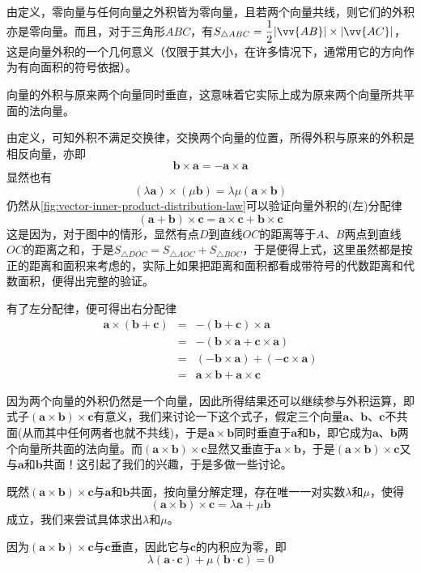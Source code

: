 由定义，零向量与任何向量之外积皆为零向量，且若两个向量共线，则它们的外积亦是零向量。而且，对于三角形$ABC$，有$S_{\triangle ABC} = \dfrac{1}{2}|\vv{AB}|\times|\vv{AC}|$，这是向量外积的一个几何意义（仅限于其大小，在许多情况下，通常用它的方向作为有向面积的符号依据）。

向量的外积与原来两个向量同时垂直，这意味着它实际上成为原来两个向量所共平面的法向量。

由定义，可知外积不满足交换律，交换两个向量的位置，所得外积与原来的外积是相反向量，亦即
\[ \bm{b} \times \bm{a} = - \bm{a} \times \bm{a} \]
显然也有
\[ (\lambda \bm{a}) \times (\mu \bm{b}) = \lambda \mu (\bm{a}\times\bm{b}) \]
仍然从\autoref{fig:vector-inner-product-distribution-law}可以验证向量外积的(左)分配律
\[ (\bm{a}+\bm{b}) \times \bm{c} = \bm{a} \times \bm{c} + \bm{b} \times \bm{c} \]
这是因为，对于图中的情形，显然有点$D$到直线$OC$的距离等于$A$、$B$两点到直线$OC$的距离之和，于是$S_{\triangle DOC} = S_{\triangle AOC} + S_{\triangle BOC}$，于是便得上式，这里虽然都是按正的距离和面积来考虑的，实际上如果把距离和面积都看成带符号的代数距离和代数面积，便得出完整的验证。

有了左分配律，便可得出右分配律
\begin{eqnarray*}
  \bm{a} \times (\bm{b} + \bm{c}) & = & - (\bm{b} + \bm{c}) \times \bm{a} \\
                                  & = & - (\bm{b} \times \bm{a} + \bm{c} \times \bm{a}) \\
                                  & = & (-\bm{b}\times\bm{a}) + (-\bm{c}\times\bm{a}) \\
  & = & \bm{a}\times\bm{b} + \bm{a}\times\bm{c}
\end{eqnarray*}

因为两个向量的外积仍然是一个向量，因此所得结果还可以继续参与外积运算，即式子$(\bm{a}\times\bm{b})\times\bm{c}$有意义，我们来讨论一下这个式子，假定三个向量$\bm{a}$、$\bm{b}$、$\bm{c}$不共面(从而其中任何两者也就不共线)，于是$\bm{a}\times\bm{b}$同时垂直于$\bm{a}$和$\bm{b}$，即它成为$\bm{a}$、$\bm{b}$两个向量所共面的法向量。而$(\bm{a}\times\bm{b})\times\bm{c}$显然又垂直于$\bm{a}\times\bm{b}$，于是$(\bm{a}\times\bm{b})\times\bm{c}$又与$\bm{a}$和$\bm{b}$共面！这引起了我们的兴趣，于是多做一些讨论。

既然$(\bm{a}\times\bm{b})\times\bm{c}$与$\bm{a}$和$\bm{b}$共面，按向量分解定理，存在唯一一对实数$\lambda$和$\mu$，使得
\[ (\bm{a}\times\bm{b})\times\bm{c}=\lambda \bm{a} + \mu \bm{b} \]
成立，我们来尝试具体求出$\lambda$和$\mu$。

因为$(\bm{a}\times\bm{b})\times\bm{c}$与$\bm{c}$垂直，因此它与$\bm{c}$的内积应为零，即
\[ \lambda (\bm{a} \cdot \bm{c}) + \mu (\bm{b} \cdot \bm{c}) = 0 \]

